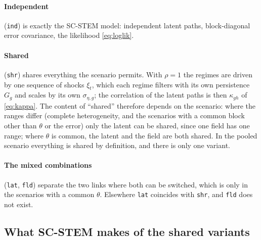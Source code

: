 \documentclass[11pt]{article}
\begin{document}
\paragraph{Independent} (\texttt{ind}) is exactly the SC-STEM model: independent latent paths, block-diagonal error covariance, the likelihood \eqref{eq:loglik}.

\paragraph{Shared} (\texttt{shr}) shares everything the scenario permits. With $\rho = 1$ the regimes are driven by one sequence of shocks $\xi_t$, which each regime filters with its own persistence $G_g$ and scales by its own $\sigma_{\eta,g}$; the correlation of the latent paths is then $\kappa_{gh}$ of \eqref{eq:kappa}. The content of ``shared'' therefore depends on the scenario: where the ranges differ (complete heterogeneity, and the scenarios with a common block other than $\theta$ or the error) only the latent can be shared, since one field has one range; where $\theta$ is common, the latent and the field are both shared. In the pooled scenario everything is shared by definition, and there is only one variant.

\paragraph{The mixed combinations} (\texttt{lat}, \texttt{fld}) separate the two links where both can be switched, which is only in the scenarios with a common $\theta$. Elsewhere \texttt{lat} coincides with \texttt{shr}, and \texttt{fld} does not exist.

\subsection{What SC-STEM makes of the shared variants}
\end{document}
